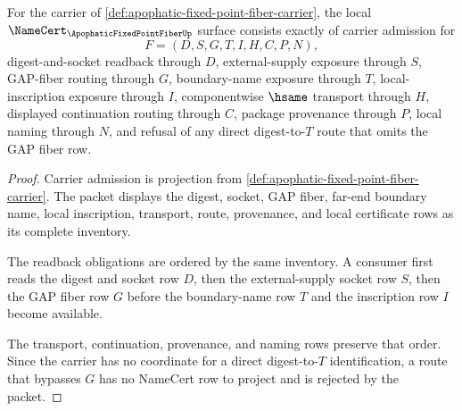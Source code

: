 \begin{theorem}
\label{thm:apophatic-fixed-point-fiber-namecert-obligations}
For the carrier of \autoref{def:apophatic-fixed-point-fiber-carrier}, the local $\NameCert_{\ApophaticFixedPointFiberUp}$ surface consists exactly of carrier admission for
$$
F=(D,S,G,T,I,H,C,P,N),
$$
digest-and-socket readback through $D$, external-supply exposure through $S$, GAP-fiber routing through $G$, boundary-name exposure through $T$, local-inscription exposure through $I$, componentwise $\hsame$ transport through $H$, displayed continuation routing through $C$, package provenance through $P$, local naming through $N$, and refusal of any direct digest-to-$T$ route that omits the GAP fiber row.
\end{theorem}
\begin{proof}
Carrier admission is projection from \autoref{def:apophatic-fixed-point-fiber-carrier}. The packet displays the digest, socket, GAP fiber, far-end boundary name, local inscription, transport, route, provenance, and local certificate rows as its complete inventory.

The readback obligations are ordered by the same inventory. A consumer first reads the digest and socket row $D$, then the external-supply socket row $S$, then the GAP fiber row $G$ before the boundary-name row $T$ and the inscription row $I$ become available.

The transport, continuation, provenance, and naming rows preserve that order. Since the carrier has no coordinate for a direct digest-to-$T$ identification, a route that bypasses $G$ has no NameCert row to project and is rejected by the packet.
\end{proof}

